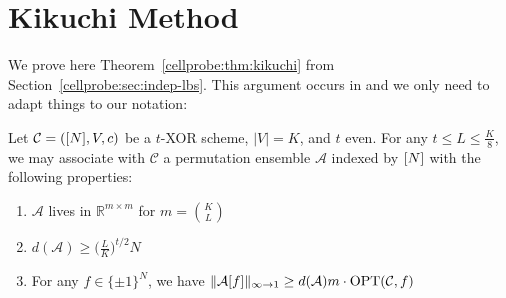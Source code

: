 \section{Kikuchi Method}\label{cellprobe:app:kikuchi}
We prove here Theorem~\ref{cellprobe:thm:kikuchi} from Section~\ref{cellprobe:sec:indep-lbs}. This argument occurs in \cite{wein2019kikuchi,smoothed} and we only need to adapt things to our notation:
\begin{theorem}
Let $\mathcal{C} = ([N],V,c)$ be a $t$-XOR scheme, $|V|=K$, and $t$ even. For any $t \leq L \leq \frac{K}{8}$, we may associate with $\mathcal{C}$ a permutation ensemble
$\mathcal{A}$ indexed by $[N]$ with the following properties:
\begin{enumerate}
	\item $\mathcal{A}$ lives in $\mathbb{R}^{m \times m}$ for $m = \binom{K}{L}$
	\item $d(\mathcal{A}) \geq \bigl(\frac{L}{K}\bigr)^{t/2} N$
	\item For any $f\in \{\pm 1\}^N$, we have $\Vert \mathcal{A}[f] \Vert_{\infty \to 1} \geq d(\mathcal{A}) m \cdot \mathrm{OPT}(\mathcal{C},f)$
\end{enumerate}
\end{theorem}
